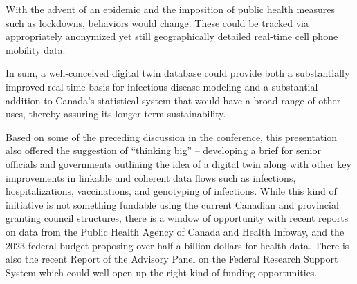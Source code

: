 With the advent of an epidemic and the imposition of public health
measures such as lockdowns, behaviors would change. These could be
tracked via appropriately anonymized yet still geographically detailed
real-time cell phone mobility data.

In sum, a well-conceived digital twin database could provide both a
substantially improved real-time basis for infectious disease modeling
and a substantial addition to Canada's statistical system that would
have a broad range of other uses, thereby assuring its longer term
sustainability.

Based on some of the preceding discussion in the conference, this
presentation also offered the suggestion of ``thinking big'' --
developing a brief for senior officials and governments outlining the
idea of a digital twin along with other key improvements in linkable and
coherent data flows such as infections, hospitalizations, vaccinations,
and genotyping of infections. While this kind of initiative is not
something fundable using the current Canadian and provincial granting
council structures, there is a window of opportunity with recent reports
on data from the Public Health Agency of Canada and Health Infoway, and
the 2023 federal budget proposing over half a billion dollars for health
data. There is also the recent Report of the Advisory Panel on the
Federal Research Support System which could well open up the right kind
of funding opportunities.
